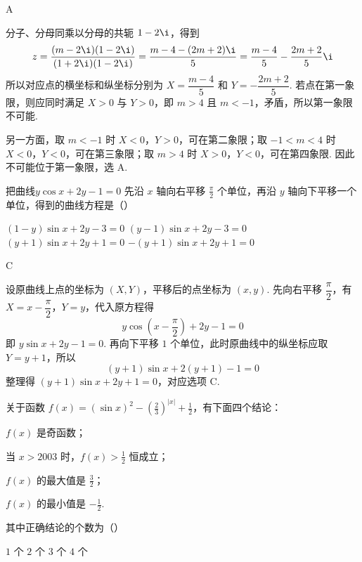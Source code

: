 \begin{answer}
A
\end{answer}

\begin{solution}
分子、分母同乘以分母的共轭 \(1-2\i\)，得到
\[
z=\frac{(m-2\i)(1-2\i)}{(1+2\i)(1-2\i)}
=\frac{m-4-(2m+2)\i}{5}
=\frac{m-4}{5}-\frac{2m+2}{5}\i
\]
所以对应点的横坐标和纵坐标分别为 \(X=\dfrac{m-4}{5}\) 和 \(Y=-\dfrac{2m+2}{5}\). 若点在第一象限，则应同时满足 \(X>0\) 与 \(Y>0\)，即 \(m>4\) 且 \(m<-1\)，矛盾，所以第一象限不可能.

另一方面，取 \(m<-1\) 时 \(X<0\)，\(Y>0\)，可在第二象限；取 \(-1<m<4\) 时 \(X<0\)，\(Y<0\)，可在第三象限；取 \(m>4\) 时 \(X>0\)，\(Y<0\)，可在第四象限. 因此不可能位于第一象限，选 A.
\end{solution}

\begin{problem}
把曲线\(y \cos x + 2y - 1 = 0\) 先沿 \(x\) 轴向右平移 \(\frac{\pi}{2}\) 个单位，再沿 \(y\) 轴向下平移一个单位，得到的曲线方程是（\quad）

\choices
    {\((1 - y)\sin x + 2y - 3 = 0\)}
    {\((y - 1)\sin x + 2y - 3 = 0\)}
    {\((y + 1)\sin x + 2y + 1 = 0\)}
    {\(-(y + 1)\sin x + 2y + 1 = 0\)}
\end{problem}

\begin{answer}
C
\end{answer}

\begin{solution}
设原曲线上点的坐标为 \((X,Y)\)，平移后的点坐标为 \((x,y)\). 先向右平移 \(\dfrac{\pi}{2}\)，有 \(X=x-\dfrac{\pi}{2}\)，\(Y=y\)，代入原方程得
\[
y\cos\left(x-\frac{\pi}{2}\right)+2y-1=0
\]
即 \(y\sin x+2y-1=0\). 再向下平移 \(1\) 个单位，此时原曲线中的纵坐标应取 \(Y=y+1\)，所以
\[
(y+1)\sin x+2(y+1)-1=0
\]
整理得 \((y+1)\sin x+2y+1=0\)，对应选项 C.
\end{solution}

\begin{problem}
关于函数 \( f(x) = (\sin x)^2 - \left(\frac{2}{3}\right)^{|x|} + \frac{1}{2} \)，有下面四个结论：

\begin{circlelist}
\item \( f(x) \) 是奇函数；
\item 当 \(x > 2003\) 时，\(f(x) > \frac{1}{2}\) 恒成立；
\item \( f(x) \) 的最大值是 \( \frac{3}{2} \)；
\item \( f(x) \) 的最小值是 \( -\frac{1}{2} \).
\end{circlelist}

其中正确结论的个数为（\quad）

\choices
    {\(1\) 个}
    {\(2\) 个}
    {\(3\) 个}
    {\(4\) 个}
\end{problem}

